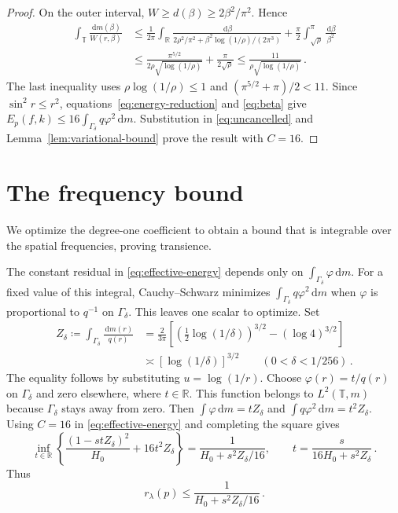 \documentclass[11pt]{amsart}
\theoremstyle{plain}
\theoremstyle{definition}
\newcommand{\R}{\mathbb R}
\newcommand{\T}{\mathbb T}
\newcommand{\1}{\mathbf 1}
\newcommand{\dd}{\,\mathrm d}
\begin{document}
\begin{proof}
On the outer interval, $W\geq d(\beta)\geq2\beta^2/\pi^2$.
Hence
\begin{equation}\label{eq:beta}
\begin{split}
  \int_\T\frac{\dd m(\beta)}{W(r,\beta)}
  &\leq\frac1{2\pi}\int_\R
    \frac{\dd\beta}{2\rho^2/\pi^2+
      \beta^2\log(1/\rho)/(2\pi^3)}
    +\frac\pi2\int_{\sqrt\rho}^\pi\frac{\dd\beta}{\beta^2}\\
  &\leq\frac{\pi^{5/2}}{2\rho\sqrt{\log(1/\rho)}}
    +\frac\pi{2\sqrt\rho}
  \leq\frac{11}{\rho\sqrt{\log(1/\rho)}}\, .
\end{split}
\end{equation}
The last inequality uses $\rho\log(1/\rho)\leq1$ and
$(\pi^{5/2}+\pi)/2<11$.
Since $\sin^2r\leq r^2$, equations~\eqref{eq:energy-reduction} and
\eqref{eq:beta} give $E_p(f,k)\leq16\int_{\Gamma_\delta}q\varphi^2\dd m$.
Substitution in \eqref{eq:uncancelled} and Lemma~\ref{lem:variational-bound}
prove the result with $C=16$.
\end{proof}

\section{The frequency bound}\label{sec:fixed-frequency}

We optimize the degree-one coefficient to obtain a bound that is
integrable over the spatial frequencies, proving transience.

The constant residual in \eqref{eq:effective-energy} depends only on
$\int_{\Gamma_\delta}\varphi\dd m$.
For a fixed value of this integral, Cauchy--Schwarz minimizes
$\int_{\Gamma_\delta}q\varphi^2\dd m$ when $\varphi$ is proportional to
$q^{-1}$ on $\Gamma_\delta$.  This leaves one scalar to optimize.  Set
\begin{equation}\label{eq:Z}
\begin{split}
  Z_\delta\coloneqq\int_{\Gamma_\delta}\frac{\dd m(r)}{q(r)}
  &=\frac{2}{3\pi}\left[
    \left(\tfrac12\log(1/\delta)\right)^{3/2}
     -(\log4)^{3/2}\right]\\
  &\asymp[\log(1/\delta)]^{3/2}
  \qquad(0<\delta<1/256)\, .
\end{split}
\end{equation}
The equality follows by substituting $u=\log(1/r)$.
Choose $\varphi(r)=t/q(r)$ on $\Gamma_\delta$ and zero elsewhere,
where $t\in\R$.  This function belongs to $L^2(\T,m)$ because
$\Gamma_\delta$ stays away from zero.  Then
$\int\varphi\dd m=tZ_\delta$ and
$\int q\varphi^2\dd m=t^2Z_\delta$.
Using $C=16$ in \eqref{eq:effective-energy} and completing the square gives
\begin{equation}\label{eq:scalar-minimum}
  \inf_{t\in\R}\left\{\frac{(1-stZ_\delta)^2}{H_0}
    +16t^2Z_\delta\right\}
  =\frac1{H_0+s^2Z_\delta/16},\qquad
  t=\frac{s}{16H_0+s^2Z_\delta}\, .
\end{equation}
Thus
\begin{equation}\label{eq:optimized}
  r_\lambda(p)\leq\frac1{H_0+s^2Z_\delta/16}\, .
\end{equation}
\end{document}
